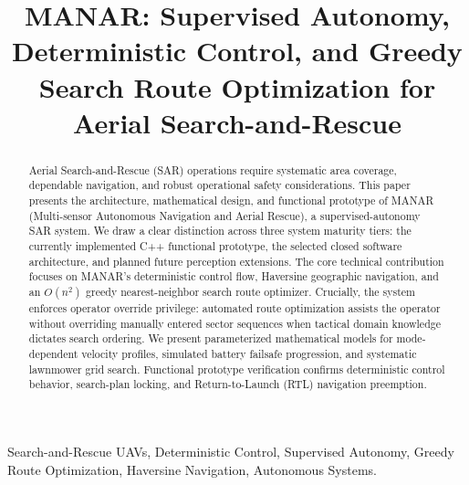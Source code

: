 \documentclass[conference]{IEEEtran}
\begin{document}
\title{MANAR: Supervised Autonomy, Deterministic Control, and Greedy Search Route Optimization for Aerial Search-and-Rescue}

\author{
}

\maketitle

\begin{abstract}
Aerial Search-and-Rescue (SAR) operations require systematic area coverage, dependable navigation, and robust operational safety considerations. This paper presents the architecture, mathematical design, and functional prototype of MANAR (Multi-sensor Autonomous Navigation and Aerial Rescue), a supervised-autonomy SAR system. We draw a clear distinction across three system maturity tiers: the currently implemented C++ functional prototype, the selected closed software architecture, and planned future perception extensions. The core technical contribution focuses on MANAR's deterministic control flow, Haversine geographic navigation, and an $O(n^2)$ greedy nearest-neighbor search route optimizer. Crucially, the system enforces operator override privilege: automated route optimization assists the operator without overriding manually entered sector sequences when tactical domain knowledge dictates search ordering. We present parameterized mathematical models for mode-dependent velocity profiles, simulated battery failsafe progression, and systematic lawnmower grid search. Functional prototype verification confirms deterministic control behavior, search-plan locking, and Return-to-Launch (RTL) navigation preemption.
\end{abstract}

\begin{IEEEkeywords}
Search-and-Rescue UAVs, Deterministic Control, Supervised Autonomy, Greedy Route Optimization, Haversine Navigation, Autonomous Systems.
\end{IEEEkeywords}

















\end{document}
